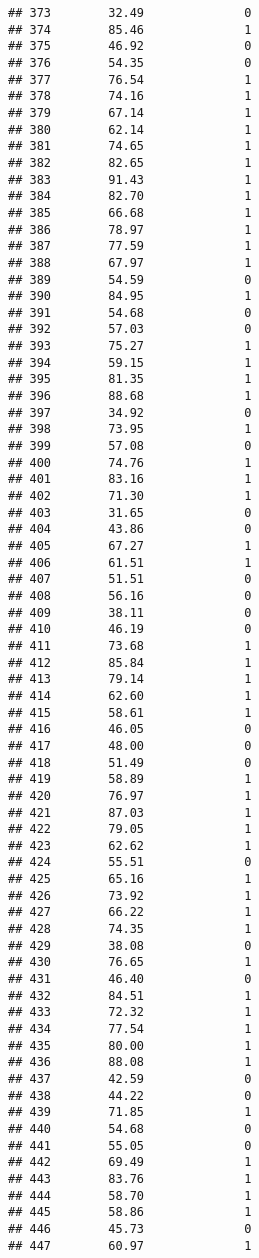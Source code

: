 \documentclass[
]{article}
\begin{document}
\begin{verbatim}
## 373        32.49              0
## 374        85.46              1
## 375        46.92              0
## 376        54.35              0
## 377        76.54              1
## 378        74.16              1
## 379        67.14              1
## 380        62.14              1
## 381        74.65              1
## 382        82.65              1
## 383        91.43              1
## 384        82.70              1
## 385        66.68              1
## 386        78.97              1
## 387        77.59              1
## 388        67.97              1
## 389        54.59              0
## 390        84.95              1
## 391        54.68              0
## 392        57.03              0
## 393        75.27              1
## 394        59.15              1
## 395        81.35              1
## 396        88.68              1
## 397        34.92              0
## 398        73.95              1
## 399        57.08              0
## 400        74.76              1
## 401        83.16              1
## 402        71.30              1
## 403        31.65              0
## 404        43.86              0
## 405        67.27              1
## 406        61.51              1
## 407        51.51              0
## 408        56.16              0
## 409        38.11              0
## 410        46.19              0
## 411        73.68              1
## 412        85.84              1
## 413        79.14              1
## 414        62.60              1
## 415        58.61              1
## 416        46.05              0
## 417        48.00              0
## 418        51.49              0
## 419        58.89              1
## 420        76.97              1
## 421        87.03              1
## 422        79.05              1
## 423        62.62              1
## 424        55.51              0
## 425        65.16              1
## 426        73.92              1
## 427        66.22              1
## 428        74.35              1
## 429        38.08              0
## 430        76.65              1
## 431        46.40              0
## 432        84.51              1
## 433        72.32              1
## 434        77.54              1
## 435        80.00              1
## 436        88.08              1
## 437        42.59              0
## 438        44.22              0
## 439        71.85              1
## 440        54.68              0
## 441        55.05              0
## 442        69.49              1
## 443        83.76              1
## 444        58.70              1
## 445        58.86              1
## 446        45.73              0
## 447        60.97              1

\end{verbatim}
\end{document}
